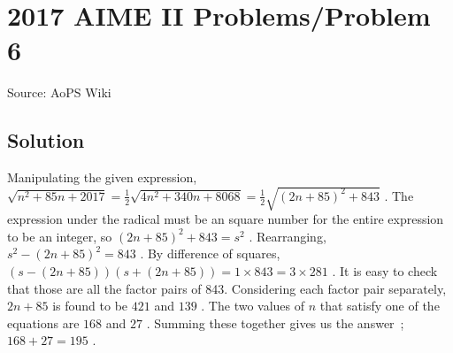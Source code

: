 \documentclass[12pt]{article}
\begin{document}
\section*{{2017 AIME II Problems/Problem 6}}
Source: AoPS Wiki

\subsection*{Solution}
Manipulating the given expression, $\sqrt{n^2+85n+2017}=\frac{1}{2}\sqrt{4n^2+340n+8068}=\frac{1}{2}\sqrt{(2n+85)^2+843}$ . The expression under the radical must be an square number for the entire expression to be an integer, so $(2n+85)^2+843=s^2$ . Rearranging, $s^2-(2n+85)^2=843$ . By difference of squares, $(s-(2n+85))(s+(2n+85))=1\times843=3\times281$ . It is easy to check that those are all the factor pairs of 843. Considering each factor pair separately, $2n+85$ is found to be $421$ and $139$ . The two values of $n$ that satisfy one of the equations are $168$ and $27$ . Summing these together gives us the answer ; $168+27=\boxed{195}$ .
\end{document}
